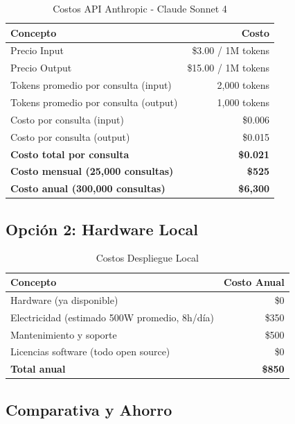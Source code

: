 \documentclass[12pt,letterpaper]{article}
\begin{document}
\begin{table}[h]
\centering
\caption{Costos API Anthropic - Claude Sonnet 4}
\begin{tabular}{@{}lr@{}}
\toprule
\textbf{Concepto} & \textbf{Costo} \\
\midrule
Precio Input & \$3.00 / 1M tokens \\
Precio Output & \$15.00 / 1M tokens \\
\midrule
Tokens promedio por consulta (input) & 2,000 tokens \\
Tokens promedio por consulta (output) & 1,000 tokens \\
\midrule
Costo por consulta (input) & \$0.006 \\
Costo por consulta (output) & \$0.015 \\
\textbf{Costo total por consulta} & \textbf{\$0.021} \\
\midrule
\textbf{Costo mensual (25,000 consultas)} & \textbf{\$525} \\
\textbf{Costo anual (300,000 consultas)} & \textbf{\$6,300} \\
\bottomrule
\end{tabular}
\end{table}

\subsection{Opci\'on 2: Hardware Local}

\begin{table}[h]
\centering
\caption{Costos Despliegue Local}
\begin{tabular}{@{}lr@{}}
\toprule
\textbf{Concepto} & \textbf{Costo Anual} \\
\midrule
Hardware (ya disponible) & \$0 \\
Electricidad (estimado 500W promedio, 8h/d\'ia) & \$350 \\
Mantenimiento y soporte & \$500 \\
Licencias software (todo open source) & \$0 \\
\midrule
\textbf{Total anual} & \textbf{\$850} \\
\bottomrule
\end{tabular}
\end{table}

\subsection{Comparativa y Ahorro}
\end{document}
